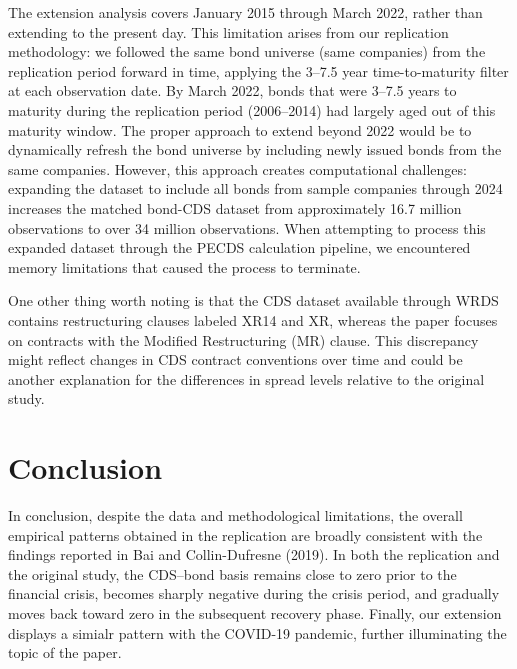 \documentclass{article}
\begin{document}
The extension analysis covers January 2015 through March 2022, rather than extending to the present day. This limitation arises from our replication methodology: we followed the same bond universe (same companies) from the replication period forward in time, applying the 3--7.5 year time-to-maturity filter at each observation date.
By March 2022, bonds that were 3--7.5 years to maturity during the replication period (2006--2014) had largely aged out of this maturity window. The proper approach to extend beyond 2022 would be to dynamically refresh the bond universe by including newly issued bonds from the same companies. However, this approach creates computational challenges: expanding the dataset to include all bonds from sample companies through 2024 increases the matched bond-CDS dataset from approximately 16.7 million observations to over 34 million observations.
When attempting to process this expanded dataset through the PECDS calculation pipeline, we encountered memory limitations that caused the process to terminate. 

One other thing worth noting is that the CDS dataset available through WRDS contains restructuring clauses labeled XR14 and XR, whereas the paper focuses on contracts with the Modified Restructuring (MR) clause. This discrepancy might reflect changes in CDS contract conventions over time and could be another explanation for the differences in spread levels relative to the original study.

\section{Conclusion}

In conclusion, despite the data and methodological limitations, the overall empirical patterns obtained in the replication are broadly consistent with the findings reported in Bai and Collin-Dufresne (2019). In both the replication and the original study, the CDS--bond basis remains close to zero prior to the financial crisis, becomes sharply negative during the crisis period, and gradually moves back toward zero in the subsequent recovery phase.
Finally, our extension displays a simialr pattern with the COVID-19 pandemic, further illuminating the topic of the paper.
\end{document}
